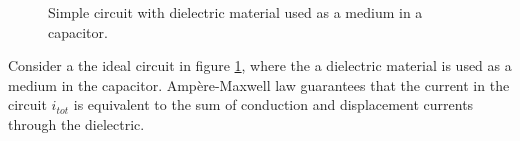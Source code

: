 \documentclass[11pt,a4paper]{article}
\begin{document}
\begin{figure}
	\centering
	\caption{Simple circuit with dielectric material used as a medium in a capacitor.}
	\label{fig:circuit}
\end{figure}

Consider a the ideal circuit in figure \ref{fig:circuit}, where the a dielectric material is used as a medium in the capacitor. Ampère-Maxwell law guarantees that the current in the circuit \(i_{tot}\) is equivalent to the sum of conduction and displacement currents through the dielectric.
\end{document}
